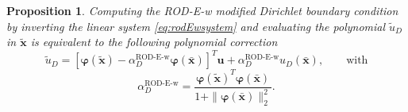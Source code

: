 \documentclass{article}
\renewcommand{\phi}{\varphi}
\newtheorem{proposition}[theorem]{Proposition}%
\begin{document}
\begin{proposition}
Computing the ROD-E-w modified Dirichlet boundary condition by inverting the linear system \eqref{eq:rodEwsystem} and evaluating the polynomial $\tilde u_D$ in $\tilde{\boldsymbol{x}}$ is equivalent to the following polynomial correction
\begin{equation}\label{eq:rodEw_final}
    \tilde u_D = [\boldsymbol{\phi}(\tilde{\boldsymbol{x}}) - \alpha_D^{\text{ROD-E-w}} \boldsymbol{\phi}(\bar{\boldsymbol{x}})]^T \boldsymbol{u} + \alpha_D^{\text{ROD-E-w}} u_D(\bar{\boldsymbol{x}}) , \quad \quad \text{with}
\end{equation}
\begin{equation}\label{eq:alpha_rod_e_w}
    \alpha_D^{\text{ROD-E-w}} = \frac{\boldsymbol{\phi}(\tilde{\boldsymbol{x}})^T \boldsymbol{\phi}(\bar{\boldsymbol{x}})}{1+\|\boldsymbol{\phi}(\bar{\boldsymbol{x}})\|^2_2}   .
\end{equation}
\end{proposition}
\end{document}
